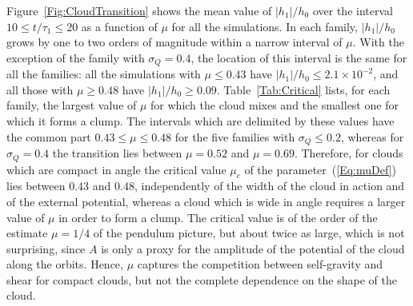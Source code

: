 Figure~\ref{Fig:CloudTransition} shows the mean value of $|h_1|/h_0$ over the interval $10\leq t/\tau_1\leq 20$ as a function of $\mu$ for all the simulations. In each family, $|h_1|/h_0$ grows by one to two orders of magnitude within a narrow interval of $\mu$. With the exception of the family with $\sigma_Q = 0.4$, the location of this interval is the same for all the families: all the simulations with $\mu\leq 0.43$ have $|h_1|/h_0\leq 2.1\times 10^{-2}$, and all those with $\mu\geq 0.48$ have $|h_1|/h_0\geq 0.09$. Table~\ref{Tab:Critical} lists, for each family, the largest value of $\mu$ for which the cloud mixes and the smallest one for which it forms a clump. The intervals which are delimited by these values have the common part $0.43\leq\mu\leq 0.48$ for the five families with $\sigma_Q\leq 0.2$, whereas for $\sigma_Q = 0.4$ the transition lies between $\mu = 0.52$ and $\mu = 0.69$. Therefore, for clouds which are compact in angle the critical value $\mu_c$ of the parameter~(\ref{Eq:muDef}) lies between $0.43$ and $0.48$, independently of the width of the cloud in action and of the external potential, whereas a cloud which is wide in angle requires a larger value of $\mu$ in order to form a clump. The critical value is of the order of the estimate $\mu = 1/4$ of the pendulum picture, but about twice as large, which is not surprising, since $A$ is only a proxy for the amplitude of the potential of the cloud along the orbits. Hence, $\mu$ captures the competition between self-gravity and shear for compact clouds, but not the complete dependence on the shape of the cloud. 

